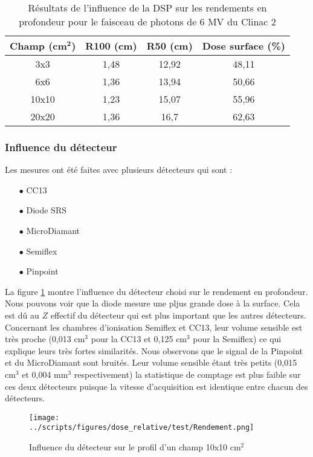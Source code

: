 \documentclass{article}
\begin{document}
\begin{table}[h]
  \centering
  \begin{tabular}{cccc}
    \toprule
    \textbf{Champ (cm}$\mathbf{^2}$\textbf{)} & \textbf{R100 (cm)} & \textbf{R50 (cm)} & \textbf{Dose surface (\%)} \\
    \toprule
    3x3 & 1,48 & 12,92 & 48,11 \\
    6x6 & 1,36 & 13,94 &  50,66 \\
    10x10 & 1,23 & 15,07 & 55,96 \\
    20x20 & 1,36 & 16,7 & 62,63 \\
    \bottomrule
  \end{tabular}
  \caption{Résultats de l'influence de la DSP sur les rendements en profondeur pour le faisceau de photons de 6 MV du Clinac 2}
  \label{table_rdt_dsp}
\end{table}

\subsubsection{Influence du détecteur}

Les mesures ont été faites avec plusieurs détecteurs qui sont :

\begin{itemize}
  \item[$\bullet$] CC13
  \item[$\bullet$] Diode SRS
  \item[$\bullet$] MicroDiamant
  \item[$\bullet$] Semiflex
  \item[$\bullet$] Pinpoint
\end{itemize}

La figure \ref*{fig_rdt_detecteurs} montre l'influence du détecteur choisi sur le rendement en profondeur. Nous pouvons voir que la diode mesure une pljus grande dose à la surface. Cela est dû au $Z$ effectif du détecteur qui est plus important que les autres détecteurs. Concernant les chambres d'ionisation Semiflex et CC13, leur volume sensible est très proche (0,013 cm$^3$ pour la CC13 et 0,125 cm$^3$ pour la Semiflex) ce qui explique leurs très fortes similarités. Nous observons que le signal de la Pinpoint et du MicroDiamant sont bruités. Leur volume sensible étant très petits (0,015 cm$^3$ et 0,004 mm$^3$ respectivement) la statistique de comptage est plus faible sur ces deux détecteurs puisque la vitesse d'acquisition est identique entre chacun des détecteurs.

\begin{figure}[h]
  \centering
  \texttt{[image: ../scripts/figures/dose\_relative/test/Rendement.png]}
  \caption{Influence du détecteur sur le profil d'un champ 10x10 cm$^2$}
  \label{fig_rdt_detecteurs}
\end{figure}
\end{document}
